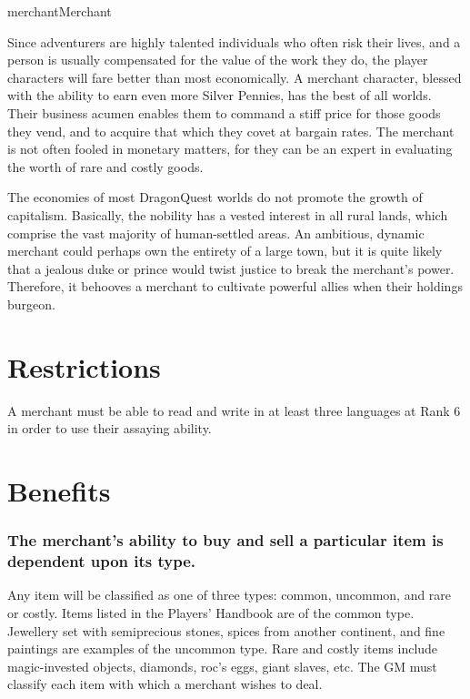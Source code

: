 \begin{Skill}[1.1]{merchant}{Merchant}

Since adventurers are highly talented individuals who often risk their
lives, and a person is usually compensated for the value of the work
they do, the player characters will fare better than most
economically.  A merchant character, blessed with the ability to earn
even more Silver Pennies, has the best of all worlds.  Their business
acumen enables them to command a stiff price for those goods they
vend, and to acquire that which they covet at bargain rates.  The
merchant is not often fooled in monetary matters, for they can be an
expert in evaluating the worth of rare and costly goods.

The economies of most DragonQuest worlds do not promote the growth of
capitalism.  Basically, the nobility has a vested interest in all
rural lands, which comprise the vast majority of human-settled areas.
An ambitious, dynamic merchant could perhaps own the entirety of a
large town, but it is quite likely that a jealous duke or prince would
twist justice to break the merchant’s power. Therefore, it behooves a
merchant to cultivate powerful allies when their holdings burgeon.

\section{Restrictions}

A merchant must be able to read and write in at least three languages
at Rank 6 in order to use their assaying ability.

\section{Benefits}

\subsubsection{The merchant’s ability to buy and sell a particular item is dependent
upon its type.}

Any item will be classified as one of three types: common, uncommon,
and rare or costly.  Items listed in the Players’ Handbook are of the
common type. Jewellery set with semiprecious stones, spices from
another continent, and fine paintings are examples of the uncommon
type.  Rare and costly items include magic-invested objects, diamonds,
roc’s eggs, giant slaves, etc. The GM must classify each item with
which a merchant wishes to deal.


\end{Skill}
